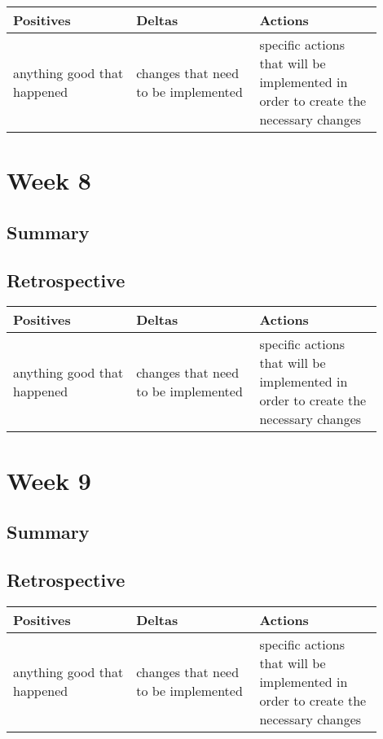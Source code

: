 \documentclass[letterpaper,10pt,serif,draftclsnofoot,onecolumn,compsoc,titlepage]{IEEEtran}
\begin{document}
\begin{tabular}{|p{0.3\linewidth}|p{0.3\linewidth}|p{0.3\linewidth}|}
   \hline
   \textbf{Positives} & \textbf{Deltas} & \textbf{Actions}\\ 
   \hline
   anything good that happened & changes that need to be implemented & specific actions that will be implemented in order to create the necessary changes \\
   \hline
\end{tabular}

\section{Week 8}

\subsection{Summary}


\subsection{Retrospective}


\begin{tabular}{|p{0.3\linewidth}|p{0.3\linewidth}|p{0.3\linewidth}|}
   \hline
   \textbf{Positives} & \textbf{Deltas} & \textbf{Actions}\\ 
   \hline
   anything good that happened & changes that need to be implemented & specific actions that will be implemented in order to create the necessary changes \\
   \hline
\end{tabular}

\section{Week 9}

\subsection{Summary}


\subsection{Retrospective}


\begin{tabular}{|p{0.3\linewidth}|p{0.3\linewidth}|p{0.3\linewidth}|}
   \hline
   \textbf{Positives} & \textbf{Deltas} & \textbf{Actions}\\ 
   \hline
   anything good that happened & changes that need to be implemented & specific actions that will be implemented in order to create the necessary changes \\
   \hline
\end{tabular}
\end{document}
